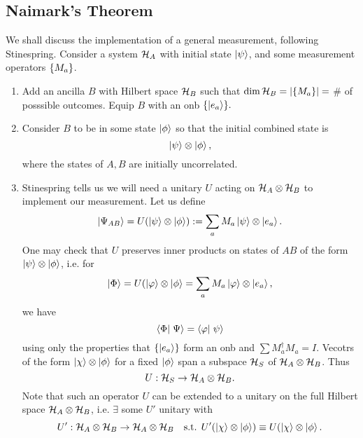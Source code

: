 \subsection*{Naimark's Theorem} We shall discuss the implementation of a general measurement, following Stinespring.
Consider a system $\mathcal H_A$ with initial state $\left| \psi \right>$, and some measurement operators $\{M_a\}$.
\begin{enumerate}
    \item Add an ancilla $B$ with Hilbert space $\mathcal H_B$ such that $\dim \mathcal H_B=|\{M_a\}|={}$\# of posssible outcomes. Equip $B$ with an onb $\{\left| e_a \right>\}.$
    \item Consider $B$ to be in some state $\left| \phi \right>$ so that the initial combined state is
    \begin{equation}
        \left| \psi \right>\otimes \left| \phi \right>,
    \end{equation}
    where the states of $A,B$ are initially uncorrelated.
    \item Stinespring tells us we will need a unitary $U$ acting on $\mathcal H_A \otimes \mathcal H_B$ to implement our measurement. Let us define
    \begin{equation}
        \left| \Psi_{AB} \right>=U(\left| \psi \right>\otimes \left| \phi \right>) := \sum_a M_a \left| \psi \right>\otimes \left| e_a \right>.
    \end{equation}
    One may check that $U$ preserves inner products on states of $AB$ of the form $\left| \psi \right>\otimes \left| \phi \right>$, i.e. for
    \begin{equation}
        \left| \Phi \right>=U(\left| \varphi \right>\otimes \left| \phi \right>=\sum_a M_a \left| \varphi \right>\otimes \left| e_a \right>,
    \end{equation}
    we have
    \begin{equation}
        \braket{\Phi}{\Psi}=\braket{\varphi}{\psi}
    \end{equation}
    using only the properties that $\{\left| e_a \right>\}$ form an onb and $\sum M_a^\dagger M_a=I$.
    Vecotrs of the form $\left| \chi \right>\otimes \left| \phi \right>$ for a fixed $\left| \phi \right>$ span a subspace $\mathcal H_S$ of $\mathcal H_A\otimes \mathcal H_B$. Thus
    \begin{equation}
        U:\mathcal H_S \to \mathcal H_A \otimes \mathcal H_B.
    \end{equation}
    Note that such an operator $U$ can be extended to a unitary on the full Hilbert space $\mathcal H_A\otimes \mathcal H_B$, i.e. $\exists$ some $U'$ unitary with
    \begin{equation}
        U': \cH_A\otimes \cH_B \to \cH_A \otimes \cH_B \quad\text{s.t. } U'(\ket{\chi}\otimes \ket{\phi}) \equiv U(\ket{\chi}\otimes\ket{\phi}.

\end{equation}
\end{enumerate}
